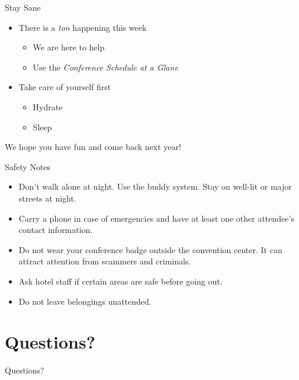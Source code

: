 \documentclass[presentation,xcolor=table]{beamer}
\begin{document}
\begin{frame}[label={sec:orgd8423b1}]{Stay Sane}
\begin{itemize}
\item There is a \emph{ton} happening this week
\begin{itemize}
\item We are here to help
\item Use the \emph{Conference Schedule at a Glane}
\end{itemize}
\item Take care of yourself first
\begin{itemize}
\item Hydrate
\item Sleep
\end{itemize}
\end{itemize}

\begin{block}{\centering We hope you have fun and come back next year!}
\end{block}
\end{frame}

\begin{frame}[label={sec:org198dfa4}]{Safety Notes}
\begin{itemize}
\item Don’t walk alone at night. Use the buddy system. Stay on well-lit or major streets at night.
\item Carry a phone in case of emergencies and have at least one other attendee’s contact information.
\item Do not wear your conference badge outside the convention center. It can attract attention from scammers and criminals.
\item Ask hotel staff if certain areas are safe before going out.
\item Do not leave belongings unattended.
\end{itemize}
\end{frame}

\section{Questions?}
\label{sec:orgc40eee1}

\begin{frame}[label={sec:orgf32cb30}]{Questions?}
\end{frame}
\end{document}
